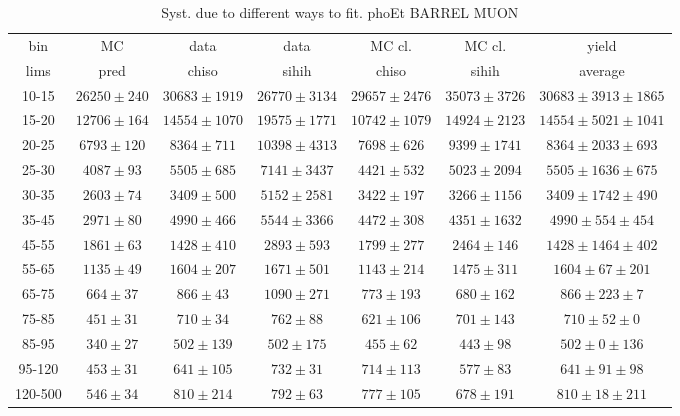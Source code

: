 \begin{table}[h]
  \scriptsize
  \begin{center}
  \caption{Syst. due to different ways to fit. phoEt BARREL MUON}
  \begin{tabular}{|c|c|c|c|c|c|c|}
    bin &  MC   & data  & data  & MC cl. & MC cl. & yield\\ 
    lims & pred & chiso & sihih & chiso  & sihih  & average \\ \hline
    10-15 & $26250\pm240$ & $30683\pm1919$ & $26770\pm3134$ & $29657\pm2476$ & $35073\pm3726$ &$30683\pm3913\pm1865$  \\ \hline
    15-20 & $12706\pm164$ & $14554\pm1070$ & $19575\pm1771$ & $10742\pm1079$ & $14924\pm2123$ &$14554\pm5021\pm1041$  \\ \hline
    20-25 & $6793\pm120$ & $8364\pm711$ & $10398\pm4313$ & $7698\pm626$ & $9399\pm1741$ &$8364\pm2033\pm693$  \\ \hline
    25-30 & $4087\pm93$ & $5505\pm685$ & $7141\pm3437$ & $4421\pm532$ & $5023\pm2094$ &$5505\pm1636\pm675$  \\ \hline
    30-35 & $2603\pm74$ & $3409\pm500$ & $5152\pm2581$ & $3422\pm197$ & $3266\pm1156$ &$3409\pm1742\pm490$  \\ \hline
    35-45 & $2971\pm80$ & $4990\pm466$ & $5544\pm3366$ & $4472\pm308$ & $4351\pm1632$ &$4990\pm554\pm454$  \\ \hline
    45-55 & $1861\pm63$ & $1428\pm410$ & $2893\pm593$ & $1799\pm277$ & $2464\pm146$ &$1428\pm1464\pm402$  \\ \hline
    55-65 & $1135\pm49$ & $1604\pm207$ & $1671\pm501$ & $1143\pm214$ & $1475\pm311$ &$1604\pm67\pm201$  \\ \hline
    65-75 & $664\pm37$ & $866\pm43$ & $1090\pm271$ & $773\pm193$ & $680\pm162$ &$866\pm223\pm7$  \\ \hline
    75-85 & $451\pm31$ & $710\pm34$ & $762\pm88$ & $621\pm106$ & $701\pm143$ &$710\pm52\pm0$  \\ \hline
    85-95 & $340\pm27$ & $502\pm139$ & $502\pm175$ & $455\pm62$ & $443\pm98$ &$502\pm0\pm136$  \\ \hline
    95-120 & $453\pm31$ & $641\pm105$ & $732\pm31$ & $714\pm113$ & $577\pm83$ &$641\pm91\pm98$  \\ \hline
    120-500 & $546\pm34$ & $810\pm214$ & $792\pm63$ & $777\pm105$ & $678\pm191$ &$810\pm18\pm211$  \\ \hline
  \end{tabular}
  \label{tab:diff_ways_to_fit_phoEt_BARREL_muon}
  \end{center}
\end{table}
